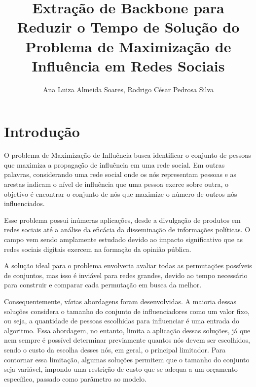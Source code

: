 \documentclass[12pt]{article}
\title{Extração de Backbone para Reduzir o Tempo de Solução do Problema de Maximização de Influência em Redes Sociais} %
\author{Ana Luiza Almeida Soares\inst{1}, Rodrigo César Pedrosa Silva\inst{1}} %
\begin{document}
\maketitle %

     

\section{Introdução}

O problema de Maximização de Influência busca identificar o conjunto de pessoas que maximiza a propagação de influência em uma rede social. Em outras palavras, considerando uma rede social onde os nós representam pessoas e as arestas indicam o nível de influência que uma pessoa exerce sobre outra, o objetivo é encontrar o conjunto de nós que maximize o número de outros nós influenciados.

Esse problema possui inúmeras aplicações, desde a divulgação de produtos em redes sociais até a análise da eficácia da disseminação de informações políticas. O campo vem sendo amplamente estudado devido ao impacto significativo que as redes sociais digitais exercem na formação da opinião pública.

A solução ideal para o problema envolveria avaliar todas as permutações possíveis de conjuntos, mas isso é inviável para redes grandes, devido ao tempo necessário para construir e comparar cada permutação em busca da melhor. 

Consequentemente, várias abordagens foram desenvolvidas. A maioria dessas soluções considera o tamanho do conjunto de influenciadores como um valor fixo, ou seja, a quantidade de pessoas escolhidas para influenciar é uma entrada do algoritmo. Essa abordagem, no entanto, limita a aplicação dessas soluções, já que nem sempre é possível determinar previamente quantos nós devem ser escolhidos, sendo o custo da escolha desses nós, em geral, o principal limitador. Para contornar essa limitação, algumas soluções permitem que o tamanho do conjunto seja variável, impondo uma restrição de custo que se adequa a um orçamento específico, passado como parâmetro ao modelo.
\end{document}
